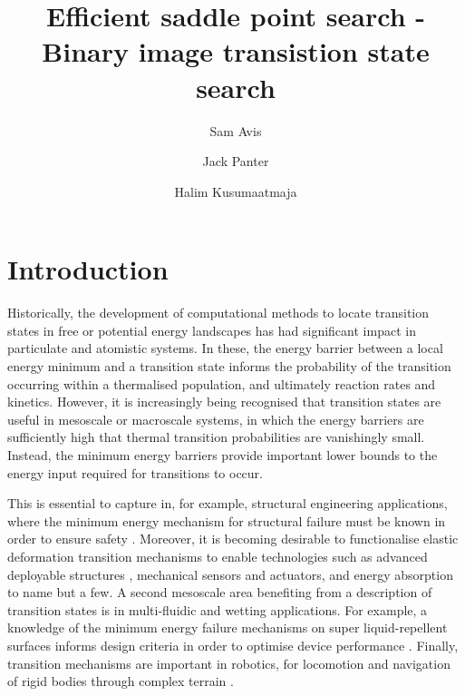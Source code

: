 \documentclass[aps,twocolumn]{revtex4}
\begin{document}
\title{Efficient saddle point search - Binary image transistion state search}
\author{Sam Avis}
\author{Jack Panter}
\author{Halim Kusumaatmaja}

\begin{abstract}
\lipsum[1]
\end{abstract}

\maketitle


\section{Introduction}
Historically, the development of computational methods to locate transition states in free or potential energy landscapes has had significant impact in particulate and atomistic systems.
In these, the energy barrier between a local energy minimum and a transition state informs the probability of the transition occurring within a thermalised population, and ultimately reaction rates and kinetics.
However, it is increasingly being recognised that transition states are useful in mesoscale or macroscale systems, in which the energy barriers are sufficiently high that thermal transition probabilities are vanishingly small.
Instead, the minimum energy barriers provide important lower bounds to the energy input required for transitions to occur.

This is essential to capture in, for example, structural engineering applications, where the minimum energy mechanism for structural failure must be known in order to ensure safety \cite{Panter2019,Hutchinson2018}.
Moreover, it is becoming desirable to functionalise elastic deformation transition mechanisms to enable technologies such as advanced deployable structures \cite{Filipov2015,Zhai2018}, mechanical sensors and actuators, and energy absorption \cite{Shan2015} to name but a few.
A second mesoscale area benefiting from a description of transition states is in multi-fluidic and wetting applications.
For example, a knowledge of the minimum energy failure mechanisms on super liquid-repellent surfaces informs design criteria in order to optimise device performance \cite{Zhang2014,Panter2019b}.
Finally, transition mechanisms are important in robotics, for locomotion and navigation of rigid bodies through complex terrain \cite{Othayoth2020}.
\end{document}
